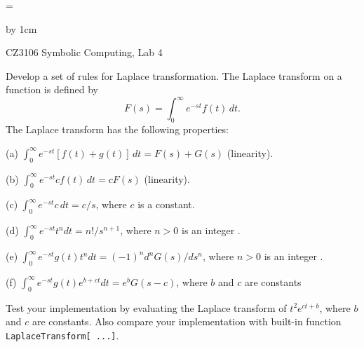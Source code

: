 \magnification=

\advance\vsize by 1cm
\nopagenumbers

\centerline{\titlefont CZ3106 Symbolic Computing, Lab 4}
\bigskip
{}
\bigskip
%

\bigskip
\problem Develop a set of rules for Laplace transformation.  
The Laplace transform on a function is defined by
$$ F(s) = \int_0^\infty e^{-st} f(t)\,dt.$$
The Laplace transform has the following properties:
\item{} (a) $\int_0^\infty e^{-st}[ f(t) + g(t)]\,dt = F(s) + G(s)$ (linearity).
\item{} (b) $\int_0^\infty e^{-st} c f(t)\,dt = c F(s)$ (linearity).
\item{} (c) $\int_0^\infty e^{-st} c\,dt = c/s$, where $c$ is a constant. 
\item{} (d) $\int_0^\infty e^{-st} t^n dt = n!/s^{n+1}$, where $n>0$ is an integer .
\item{} (e) $\int_0^\infty e^{-st} g(t) t^n dt = (-1)^n {d^n G(s)/ds^n}$, where $n>0$ is an integer .
\item{} (f) $\int_0^\infty e^{-st} g(t) e^{b+ct} dt = e^b G(s-c)$, where $b$ 
and $c$ are constants

\item{} Test your implementation by evaluating the Laplace transform of
$t^2 e^{c t + b}$, where $b$ and $c$ are constants.  Also compare your
implementation with built-in function {\tt LaplaceTransform[ ...]}.

